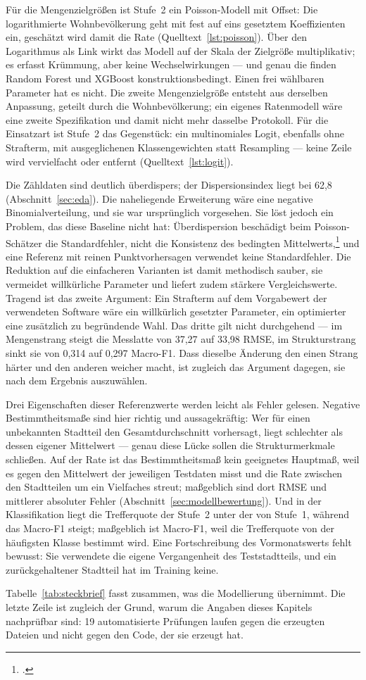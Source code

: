 Für die Mengenzielgrößen ist Stufe~2 ein Poisson-Modell mit Offset: Die
logarithmierte Wohnbevölkerung geht mit fest auf eins gesetztem Koeffizienten
ein, geschätzt wird damit die Rate (Quelltext~\ref{lst:poisson}). Über den
Logarithmus als Link wirkt das Modell auf der Skala der Zielgröße
multiplikativ; es erfasst Krümmung, aber keine Wechselwirkungen --- und genau
die finden Random Forest und XGBoost konstruktionsbedingt. Einen frei wählbaren
Parameter hat es nicht. Die zweite Mengenzielgröße entsteht aus derselben
Anpassung, geteilt durch die Wohnbevölkerung; ein eigenes Ratenmodell wäre eine
zweite Spezifikation und damit nicht mehr dasselbe Protokoll. Für die
Einsatzart ist Stufe~2 das Gegenstück: ein multinomiales Logit, ebenfalls ohne
Strafterm, mit ausgeglichenen Klassengewichten statt Resampling --- keine Zeile
wird vervielfacht oder entfernt (Quelltext~\ref{lst:logit}).

Die Zähldaten sind deutlich überdispers; der Dispersionsindex liegt bei 62,8
(Abschnitt~\ref{sec:eda}). Die naheliegende Erweiterung wäre eine negative
Binomialverteilung, und sie war ursprünglich vorgesehen. Sie löst jedoch ein
Problem, das diese Baseline nicht hat: Überdispersion beschädigt beim
Poisson-Schätzer die Standardfehler, nicht die Konsistenz des bedingten
Mittelwerts,\footcite[5]{Gourieroux1981} und eine Referenz mit reinen
Punktvorhersagen verwendet keine Standardfehler. Die Reduktion auf die
einfacheren Varianten ist damit methodisch sauber, sie vermeidet willkürliche
Parameter und liefert zudem stärkere Vergleichswerte. Tragend ist das zweite
Argument: Ein Strafterm auf dem Vorgabewert der verwendeten Software wäre ein
willkürlich gesetzter Parameter, ein optimierter eine zusätzlich zu begründende
Wahl. Das dritte gilt nicht durchgehend --- im Mengenstrang steigt die
Messlatte von 37,27 auf 33,98 RMSE, im Strukturstrang sinkt sie von 0,314 auf
0,297 Macro-F1. Dass dieselbe Änderung den einen Strang härter und den anderen
weicher macht, ist zugleich das Argument dagegen, sie nach dem Ergebnis
auszuwählen.

Drei Eigenschaften dieser Referenzwerte werden leicht als Fehler gelesen.
Negative Bestimmtheitsmaße sind hier richtig und aussagekräftig: Wer für einen
unbekannten Stadtteil den Gesamtdurchschnitt vorhersagt, liegt schlechter als
dessen eigener Mittelwert --- genau diese Lücke sollen die Strukturmerkmale
schließen. Auf der Rate ist das Bestimmtheitsmaß kein geeignetes Hauptmaß, weil
es gegen den Mittelwert der jeweiligen Testdaten misst und die Rate zwischen
den Stadtteilen um ein Vielfaches streut; maßgeblich sind dort RMSE und
mittlerer absoluter Fehler (Abschnitt~\ref{sec:modellbewertung}). Und in der
Klassifikation liegt die Trefferquote der Stufe~2 unter der von Stufe~1,
während das Macro-F1 steigt; maßgeblich ist Macro-F1, weil die Trefferquote von
der häufigsten Klasse bestimmt wird. Eine Fortschreibung des Vormonatswerts
fehlt bewusst: Sie verwendete die eigene Vergangenheit des Teststadtteils, und
ein zurückgehaltener Stadtteil hat im Training keine.

Tabelle~\ref{tab:steckbrief} fasst zusammen, was die Modellierung übernimmt.
Die letzte Zeile ist zugleich der Grund, warum die Angaben dieses Kapitels
nachprüfbar sind: 19 automatisierte Prüfungen laufen gegen die erzeugten
Dateien und nicht gegen den Code, der sie erzeugt hat.
